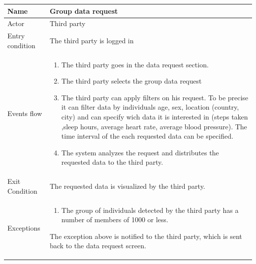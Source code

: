 \begin{tabular}{|l|p{11cm}|}
    \hline
    Name & Group data request
    \\ \hline
    Actor & Third party
    \\ \hline 
    Entry condition & The third party is logged in
        \\ \hline
    Events flow &
    \begin{enumerate}
    \item The third party goes in the data request section.
    \item The third party selects the group data request
	\item The third party can apply filters on his request. To be precise it can filter data by individuals age, sex, location (country, city) and can specify wich data it is interested in (steps taken ,sleep hours, average heart rate, average blood pressure). The time interval of the each requested data can be specified.
	\item The system analyzes the request and distributes the requested data to the third party.
    \end{enumerate}
     \\ \hline
     Exit Condition & The requested data is visualized by the third party.
     \\
    \hline
    Exceptions &
        \begin{enumerate}
    \item The group of individuals detected by the third party has a number of members of 1000 or less.     
    \end{enumerate}
      The exception above is notified to the third party, which is sent back to the data request screen.
	 \\
    \hline
\end{tabular}

\givespace
   
